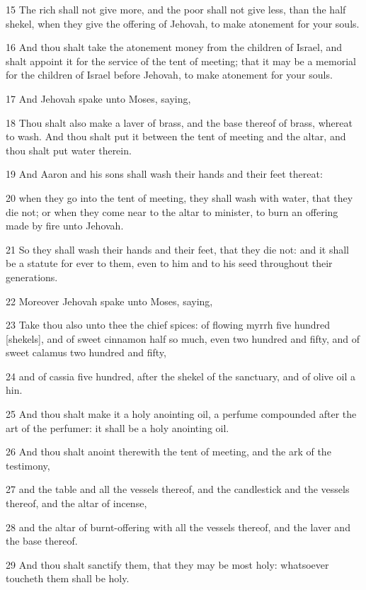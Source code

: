 \par 15 The rich shall not give more, and the poor shall not give less, than the half shekel, when they give the offering of Jehovah, to make atonement for your souls.
\par 16 And thou shalt take the atonement money from the children of Israel, and shalt appoint it for the service of the tent of meeting; that it may be a memorial for the children of Israel before Jehovah, to make atonement for your souls.
\par 17 And Jehovah spake unto Moses, saying,
\par 18 Thou shalt also make a laver of brass, and the base thereof of brass, whereat to wash. And thou shalt put it between the tent of meeting and the altar, and thou shalt put water therein.
\par 19 And Aaron and his sons shall wash their hands and their feet thereat:
\par 20 when they go into the tent of meeting, they shall wash with water, that they die not; or when they come near to the altar to minister, to burn an offering made by fire unto Jehovah.
\par 21 So they shall wash their hands and their feet, that they die not: and it shall be a statute for ever to them, even to him and to his seed throughout their generations.
\par 22 Moreover Jehovah spake unto Moses, saying,
\par 23 Take thou also unto thee the chief spices: of flowing myrrh five hundred [shekels], and of sweet cinnamon half so much, even two hundred and fifty, and of sweet calamus two hundred and fifty,
\par 24 and of cassia five hundred, after the shekel of the sanctuary, and of olive oil a hin.
\par 25 And thou shalt make it a holy anointing oil, a perfume compounded after the art of the perfumer: it shall be a holy anointing oil.
\par 26 And thou shalt anoint therewith the tent of meeting, and the ark of the testimony,
\par 27 and the table and all the vessels thereof, and the candlestick and the vessels thereof, and the altar of incense,
\par 28 and the altar of burnt-offering with all the vessels thereof, and the laver and the base thereof.
\par 29 And thou shalt sanctify them, that they may be most holy: whatsoever toucheth them shall be holy.
